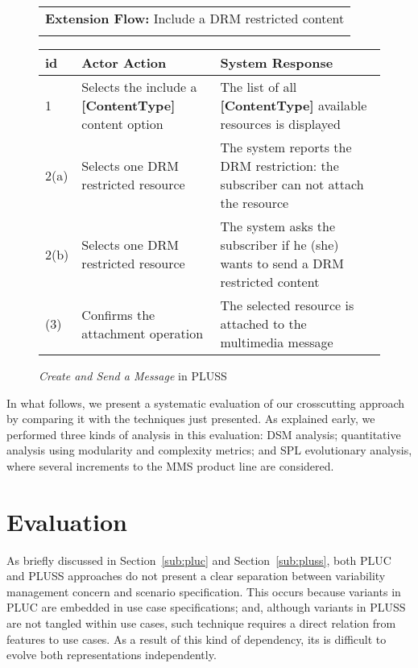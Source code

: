 \documentclass{acm_proc_article-sp}
\begin{document}
\begin{figure}[h]
\begin{center}
\begin{tiny}
{\begin{tabular}{|p{0.2in}|p{1.4in}|p{1.4in}|}
  \end{tabular} 
  \begin{tabular}{l} 
     \\
    {\bf Extension Flow:}  Include a DRM restricted content \\ \\
  \end{tabular}
  \begin{tabular}{|p{0.2in}|p{1.4in}|p{1.4in}|}
   \hline
   id & Actor Action & System Response \\ \hline 
   1 & Selects the include a {\bf [ContentType]} content option & The list of all {\bf [ContentType]} available resources is displayed \\ \hline
   2(a) & Selects one DRM restricted resource & The system reports the DRM restriction: the subscriber can not attach the resource \\ \hline
   2(b) & Selects one DRM restricted resource & The system asks the subscriber if he (she) wants to send a DRM restricted content \\ \hline
   (3)  & Confirms the attachment operation     & The selected resource is attached to the multimedia message \\ \hline
  \end{tabular} 
 } 
\end{tiny}
\end{center}
\caption{\emph{Create and Send a Message} in PLUSS}
\label{fig:pluss-01}

\end{figure}

In what follows, we present a systematic evaluation of our crosscutting approach by comparing it with the techniques just presented. As 
explained early, we performed three kinds of analysis in this evaluation: DSM analysis; quantitative analysis using modularity and 
complexity metrics; and SPL evolutionary analysis, where several increments to the MMS product line are considered.

\section{Evaluation}
\label{evaluation}

As briefly discussed in Section~\ref{sub:pluc} and Section~\ref{sub:pluss}, both PLUC and PLUSS approaches do not present a
clear separation between variability management concern and scenario specification. This occurs because variants in PLUC 
are embedded in use case specifications; and, although variants in PLUSS are not tangled within use cases, such technique 
requires a direct relation from features to use cases. As a result of this kind of dependency, its is difficult to evolve both 
representations independently. 
\end{document}

